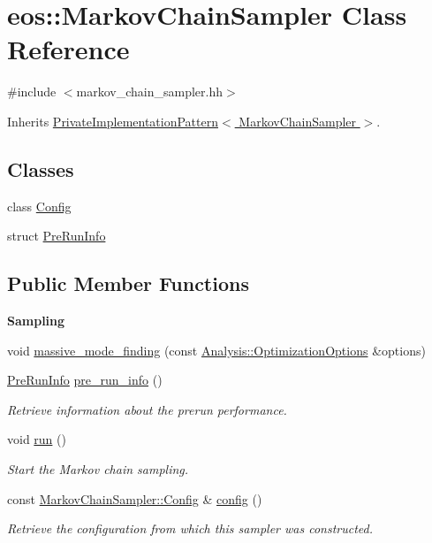 \hypertarget{classeos_1_1MarkovChainSampler}{
\section{eos::MarkovChainSampler Class Reference}
\label{classeos_1_1MarkovChainSampler}
}


{\ttfamily \#include $<$markov\_\-chain\_\-sampler.hh$>$}

Inherits \hyperlink{classeos_1_1PrivateImplementationPattern}{PrivateImplementationPattern$<$ MarkovChainSampler $>$}.\subsection*{Classes}
\begin{DoxyCompactItemize}
\item 
class \hyperlink{classeos_1_1MarkovChainSampler_1_1Config}{Config}
\item 
struct \hyperlink{structeos_1_1MarkovChainSampler_1_1PreRunInfo}{PreRunInfo}
\end{DoxyCompactItemize}
\subsection*{Public Member Functions}
\begin{Indent}{\bf Sampling}\par
{\em \label{_amgrp1d07814d12178c958e4233501cb0bdc7}
 }\begin{DoxyCompactItemize}
\item 
void \hyperlink{classeos_1_1MarkovChainSampler_a1e5ca348ae639a33c3b3db6120ff66f9}{massive\_\-mode\_\-finding} (const \hyperlink{structeos_1_1Analysis_1_1OptimizationOptions}{Analysis::OptimizationOptions} \&options)
\item 
\hyperlink{structeos_1_1MarkovChainSampler_1_1PreRunInfo}{PreRunInfo} \hyperlink{classeos_1_1MarkovChainSampler_ae3032467d9678870bb30f82ae060c043}{pre\_\-run\_\-info} ()
\begin{DoxyCompactList}\small\item\em Retrieve information about the prerun performance. \item\end{DoxyCompactList}\item 
void \hyperlink{classeos_1_1MarkovChainSampler_a67fdd21c364b34796c9c5ba2b3b0b785}{run} ()
\begin{DoxyCompactList}\small\item\em Start the Markov chain sampling. \item\end{DoxyCompactList}\item 
const \hyperlink{classeos_1_1MarkovChainSampler_1_1Config}{MarkovChainSampler::Config} \& \hyperlink{classeos_1_1MarkovChainSampler_a277acc86b109ca342be462c0e9d7c175}{config} ()
\begin{DoxyCompactList}\small\item\em Retrieve the configuration from which this sampler was constructed. \item\end{DoxyCompactList}\end{DoxyCompactItemize}
\end{Indent}
